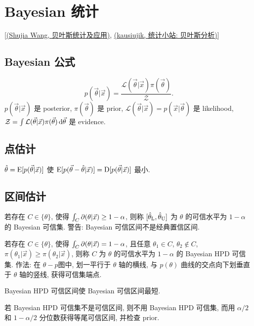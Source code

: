 \chapter{Bayesian 统计}

[\href{https://andrewwang.rbind.io/courses/bayesian_statistics/}{(Shujia Wang, 贝叶斯统计及应用)}, \href{https://andrewwang.rbind.io/courses/bayesian_statistics/}{(kausiujik, 统计小站: 贝叶斯分析)}]

\section{Bayesian 公式}

\begin{equation}
    p(\vec{\theta}|\vec{x})=\frac{\mathcal{L}(\vec{\theta}|\vec{x})\pi(\vec{\theta})}{\mathcal{Z}}.
\end{equation}
$p(\vec{\theta}|\vec{x})$ 是 posterior, $\pi(\vec{\theta})$ 是 prior, $\mathcal{L}(\vec{\theta}|\vec{x})=p(\vec{x}|\vec{\theta})$ 是 likelihood, $\mathcal{Z}=\int\mathcal{L}(\vec{\theta}|\vec{x})\pi(\vec{\theta})\,\mathrm{d}\vec{\theta}$ 是 evidence.

\section{点估计}

$\hat{\theta}=\text{E}[p(\vec{\theta}|\vec{x})]$ 使 $\text{E}[p(\vec{\theta}-\hat{\theta}|\vec{x})]=\text{D}[p(\vec{\theta}|\vec{x})]$ 最小.

\section{区间估计}

若存在 $C\in\{\theta\}$, 使得 $\int_{C}\partial(\theta|\vec{x})\ge1-\alpha$, 则称 $[\hat{\theta}_\text{L},\hat{\theta}_\text{U}]$ 为 $\theta$ 的可信水平为 $1-\alpha$ 的 Bayesian 可信集. 警告: Bayesian 可信区间不是经典置信区间.

若存在 $C\in\{\theta\}$, 使得 $\int_{C}\partial(\theta|\vec{x})=1-\alpha$, 且任意 $\theta_1\in C$, $\theta_2\notin C$, $\pi(\theta_1|\vec{x})\ge\pi(\theta_2|\vec{x})$, 则称 $C$ 为 $\theta$ 的可信水平为 $1-\alpha$ 的 Bayesian HPD 可信集. 作法: 在 $\theta-p$图中, 划一平行于 $\theta$ 轴的横线, 与 $p(\theta)$ 曲线的交点向下划垂直于 $\theta$ 轴的竖线, 获得可信集端点.

Bayesian HPD 可信区间使 Bayesian 可信区间最短.

若 Bayesian HPD 可信集不是可信区间, 则不用 Bayesian HPD 可信集, 而用 $\alpha/2$ 和 $1-\alpha/2$ 分位数获得等尾可信区间, 并检查 prior.

